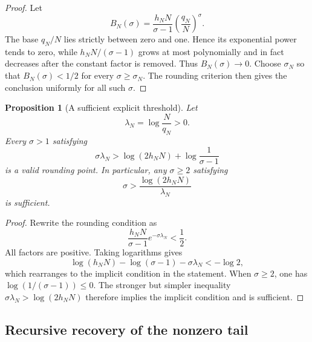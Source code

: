 \documentclass[11pt]{amsart}
\numberwithin{equation}{section}
\theoremstyle{plain}
\newtheorem{proposition}[theorem]{Proposition}
\theoremstyle{definition}
\theoremstyle{remark}
\newcommand{\1}{\mathbf{1}}
\begin{document}
\begin{proof}
Let
\begin{equation}
B_N(\sigma)
=
\frac{h_NN}{\sigma-1}
\left(\frac{q_N}{N}\right)^\sigma.
\label{eq:rounding_threshold_bound_function}
\end{equation}
The base \(q_N/N\) lies strictly between zero and one.  Hence its
exponential power tends to zero, while \(h_NN/(\sigma-1)\) grows at most
polynomially and in fact decreases after the constant factor is removed.
Thus \(B_N(\sigma)\to0\).  Choose \(\sigma_N\) so that
\(B_N(\sigma)<1/2\) for every \(\sigma\geq\sigma_N\).  The rounding
criterion then gives the conclusion uniformly for all such \(\sigma\).
\end{proof}

\begin{proposition}[A sufficient explicit threshold]
\label{prop:explicit_rounding_threshold}
Let
\begin{equation}
\lambda_N=\log\frac{N}{q_N}>0.
\label{eq:lambdaN_definition}
\end{equation}
Every $\sigma>1$ satisfying
\begin{equation}
\sigma\lambda_N
>
\log(2h_NN)+\log\frac1{\sigma-1}
\label{eq:explicit_threshold_implicit}
\end{equation}
is a valid rounding point.  In particular, any $\sigma\geq2$ satisfying
\begin{equation}
\sigma
>
\frac{\log(2h_NN)}{\lambda_N}
\label{eq:explicit_threshold_simple}
\end{equation}
is sufficient.
\end{proposition}

\begin{proof}
Rewrite the rounding condition as
\begin{equation}
\frac{h_NN}{\sigma-1}e^{-\sigma\lambda_N}<\frac12.
\label{eq:explicit_threshold_exponential_form}
\end{equation}
All factors are positive.  Taking logarithms gives
\begin{equation}
\log(h_NN)-\log(\sigma-1)-\sigma\lambda_N<-
\log2,
\label{eq:explicit_threshold_log_form}
\end{equation}
which rearranges to the implicit condition in the statement.  When
\(\sigma\geq2\), one has \(\log(1/(\sigma-1))\leq0\).  The stronger but
simpler inequality
\(\sigma\lambda_N>\log(2h_NN)\) therefore implies the implicit condition
and is sufficient.
\end{proof}

\subsection{Recursive recovery of the nonzero tail}
\label{subsec:recursive_tail_recovery}
\end{document}
